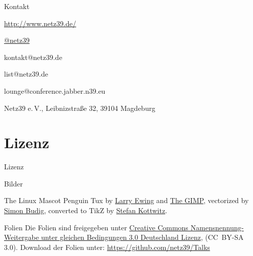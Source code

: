 \documentclass{beamer}
\begin{document}
\begin{frame}{Kontakt}
    \begin{center}
        \begin{description}
            \item[WWW] \url{http://www.netz39.de/}
            \item[Twitter] \href{https://twitter.com/netz39/}{@netz39}
            \item[E-Mail] kontakt@netz39.de
            \item[Mailingliste] list@netz39.de
            \item[Jabber/XMPP MUC] lounge@conference.jabber.n39.eu
            \item[Schneckenpost] Netz39 e.\,V., Leibnizstraße 32, 39104 Magdeburg
        \end{description}
    \end{center}
\end{frame}

\appendix

\section{Lizenz}

\begin{frame}{Lizenz}
    \begin{block}{Bilder}
        \begin{block}{The Linux Mascot}
            Penguin Tux by \href{mailto:lewing@isc.tamu.edu}{Larry Ewing}
            and \href{http://isc.tamu.edu/~lewing/linux/}{The GIMP},
            vectorized by
            \href{http://www.home.unix-ag.org/simon/}{Simon Budig},
            converted to TikZ by
            \href{http://www.texample.net/weblog/2012/apr/28/tux-tex-tikz/}{Stefan Kottwitz}.
        \end{block}
    \end{block}
    \begin{block}{Folien}
        Die Folien sind freigegeben unter
        \href{http://creativecommons.org/licenses/by-sa/3.0/de/}{Creative
        Commons Namensnennung-Weitergabe unter gleichen Bedingungen 3.0
        Deutschland Lizenz}, (CC\ BY-SA 3.0). Download der Folien unter:
        \url{https://github.com/netz39/Talks}
    \end{block}
\end{frame}
\end{document}
